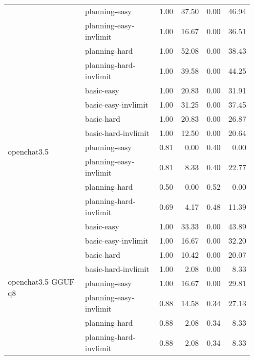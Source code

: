 \begin{tabular}{llrrrr}
 & planning-easy & 1.00 & 37.50 & 0.00 & 46.94 \\
 & planning-easy-invlimit & 1.00 & 16.67 & 0.00 & 36.51 \\
 & planning-hard & 1.00 & 52.08 & 0.00 & 38.43 \\
 & planning-hard-invlimit & 1.00 & 39.58 & 0.00 & 44.25 \\
\cline{1-6}
\multirow[c]{8}{*}{openchat3.5} & basic-easy & 1.00 & 20.83 & 0.00 & 31.91 \\
 & basic-easy-invlimit & 1.00 & 31.25 & 0.00 & 37.45 \\
 & basic-hard & 1.00 & 20.83 & 0.00 & 26.87 \\
 & basic-hard-invlimit & 1.00 & 12.50 & 0.00 & 20.64 \\
 & planning-easy & 0.81 & 0.00 & 0.40 & 0.00 \\
 & planning-easy-invlimit & 0.81 & 8.33 & 0.40 & 22.77 \\
 & planning-hard & 0.50 & 0.00 & 0.52 & 0.00 \\
 & planning-hard-invlimit & 0.69 & 4.17 & 0.48 & 11.39 \\
\cline{1-6}
\multirow[c]{8}{*}{openchat3.5-GGUF-q8} & basic-easy & 1.00 & 33.33 & 0.00 & 43.89 \\
 & basic-easy-invlimit & 1.00 & 16.67 & 0.00 & 32.20 \\
 & basic-hard & 1.00 & 10.42 & 0.00 & 20.07 \\
 & basic-hard-invlimit & 1.00 & 2.08 & 0.00 & 8.33 \\
 & planning-easy & 1.00 & 16.67 & 0.00 & 29.81 \\
 & planning-easy-invlimit & 0.88 & 14.58 & 0.34 & 27.13 \\
 & planning-hard & 0.88 & 2.08 & 0.34 & 8.33 \\
 & planning-hard-invlimit & 0.88 & 2.08 & 0.34 & 8.33 \\
\cline{1-6}
\hline
\end{tabular}
